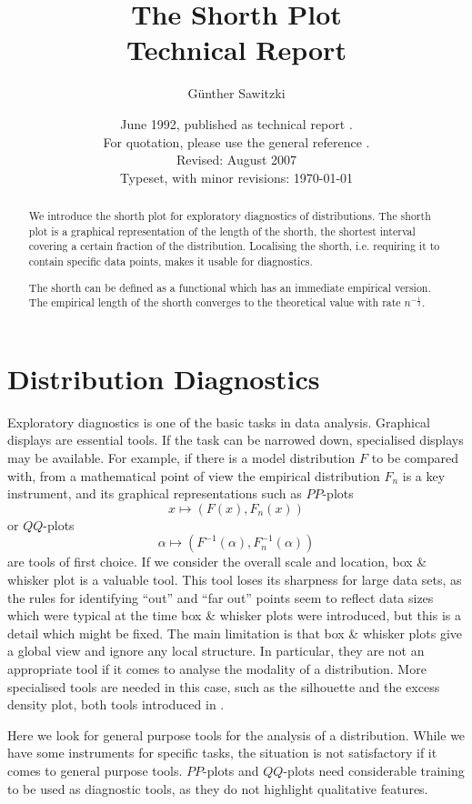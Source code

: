 \documentclass[dvips,12pt,a4paper,twoside]{amsart}
\title[The Shorth Plot]{The Shorth Plot\\\tiny{Technical Report}}
\author{G\"unther Sawitzki}
\date{June 1992, published as technical report \cite{gs92shrth}.\\
For quotation, please use the general reference \cite{gs94oned}.\\
Revised: August 2007\\
Typeset, with minor revisions: \today}                                           %
\begin{document}
\begin{abstract}
We introduce the shorth plot for exploratory diagnostics of distributions. The shorth plot is a graphical representation of the length of the shorth, the shortest interval covering a certain fraction of the distribution. Localising the shorth, i.e. requiring it to contain specific data points, makes it usable for diagnostics.

The shorth can be defined as a functional which has an immediate empirical version. The empirical length of the shorth converges to the theoretical value with rate $n^{-\frac{1}{2}}$.
\end{abstract}

\maketitle
\begingroup
\setlength{\parskip}{0pt}
\tableofcontents
\endgroup
\section{Distribution Diagnostics}
Exploratory diagnostics is one of the basic tasks in data analysis. Graphical displays are essential tools. If the task can be narrowed down, specialised displays may be available. For example, if there is a model distribution $F$ to be compared with, from a mathematical point of view the empirical distribution $F_n$ is a key instrument, and its graphical representations such as 
$PP$-plots $$x \mapsto \left(F \left(x\right),F_n \left(x \right) \right)$$ 
or $QQ$-plots $$\alpha \mapsto \left(F^{-1} \left(\alpha\right),F_n^{-1} \left(\alpha \right) \right)$$ are tools of first choice. If we consider  the overall scale and location, box \& whisker plot is a valuable tool. This tool loses its sharpness for large data sets, as the rules for identifying ``out'' and ``far out'' points seem to reflect data sizes which were typical at the time box \& whisker plots were introduced, but this is a detail which might be fixed. The main limitation is that  box \& whisker plots give a global view and ignore any local structure. In particular, they are not an appropriate tool if it comes to analyse the modality of a distribution. More specialised tools are needed in this case, such as the silhouette and the excess density plot, both tools introduced in \cite{dwmgs91jasa}.

Here we look for general purpose tools for the analysis of a distribution.
While we have some instruments for specific tasks, the situation is not satisfactory if it comes to general purpose tools. $PP$-plots and $QQ$-plots need considerable training to be used as diagnostic tools, as they do not highlight qualitative features. 
\end{document}
